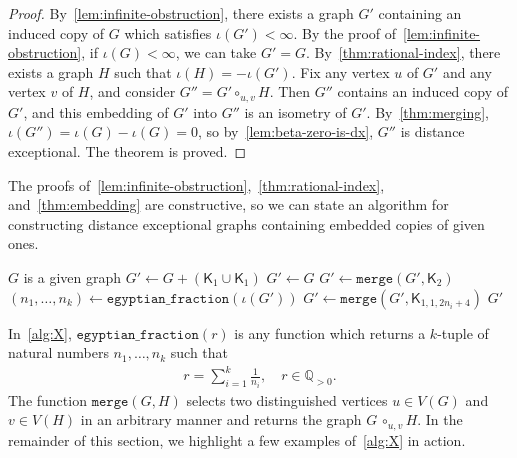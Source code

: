 \documentclass[11pt,a4paper]{article}
\newcommand{\Complete}{\mathsf{K}}
\newcommand{\Circ}{\circ}
\begin{document}
    \begin{proof}
        By~\cref{lem:infinite-obstruction}, there exists a graph $G'$ containing an induced copy of $G$ which satisfies $\iota(G')<\infty$. By the proof of~\cref{lem:infinite-obstruction}, if $\iota(G)<\infty$, we can take $G'=G$. By~\cref{thm:rational-index}, there exists a graph $H$ such that $\iota(H) = -\iota(G')$. Fix any vertex $u$ of $G'$ and any vertex $v$ of $H$, and consider $G'' = G' \Circ_{u, v} H$. Then $G''$ contains an induced copy of $G'$, and this embedding of $G'$ into $G''$ is an isometry of $G'$. By~\cref{thm:merging}, $\iota(G'') = \iota(G) - \iota(G) = 0$, so by~\cref{lem:beta-zero-is-dx}, $G''$ is distance exceptional. The theorem is proved.
    \end{proof}

    The proofs of~\cref{lem:infinite-obstruction},~\cref{thm:rational-index}, and~\cref{thm:embedding} are constructive, so we can state an algorithm for constructing distance exceptional graphs containing embedded copies of given ones.
    
    \begin{algorithm}[H]
        \caption{ Iterative procedure for creating a distance exceptional graph with given induced subgraph }\label{alg:X}
        \begin{algorithmic}[1]
        \REQUIRE $G$ is a given graph
        \STATE $G'\gets G+ (\Complete_1\cup \Complete_1)$
        \ELSE 
        \STATE $G'\gets G$
        \ENDIF
        \STATE $G' \gets\texttt{merge}(G', \Complete_2)$
        \ENDWHILE
        \STATE $(n_1,\dotsc, n_k) \gets \mathtt{egyptian\_fraction}(\iota(G'))$
        \STATE $G'\gets\mathtt{merge}(G', \Complete_{1, 1, 2 n_i+4})$
        \ENDFOR
        \RETURN $G'$
        \end{algorithmic}
    \end{algorithm}

    In~\cref{alg:X}, $\mathtt{egyptian\_fraction}(r)$ is any function which returns a $k$-tuple of natural numbers $n_1,\dotsc, n_k$ such that
        \begin{align*}
            r = \sum_{i=1}^{k}\frac{1}{n_i}, \quad r\in\mathbb{Q}_{>0}.
        \end{align*}
    The function $\mathtt{merge}(G, H)$ selects two distinguished vertices $u\in V(G)$ and $v\in V(H)$ in an arbitrary manner and returns the graph $G\,\Circ_{u, v} H$. In the remainder of this section, we highlight a few examples of~\cref{alg:X} in action.
\end{document}
